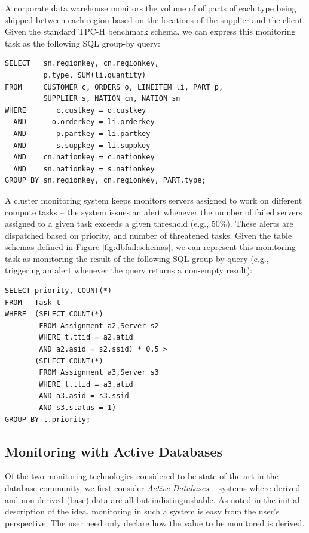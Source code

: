 \begin{example}
\label{ex:dbfail:tpch}
A corporate data warehouse monitors the volume of of parts of each type being shipped between each region based on the locations of the supplier and the client.  Given the standard TPC-H benchmark schema\cite{counciltpc}, we can express this monitoring task as the following SQL group-by query: 
\begin{verbatim}
SELECT   sn.regionkey, cn.regionkey,
         p.type, SUM(li.quantity)
FROM     CUSTOMER c, ORDERS o, LINEITEM li, PART p, 
         SUPPLIER s, NATION cn, NATION sn
WHERE       c.custkey = o.custkey
  AND      o.orderkey = li.orderkey
  AND       p.partkey = li.partkey
  AND       s.suppkey = li.suppkey
  AND    cn.nationkey = c.nationkey
  AND    sn.nationkey = s.nationkey
GROUP BY sn.regionkey, cn.regionkey, PART.type;
\end{verbatim}

\end{example}

\begin{example}
\label{ex:dbfail:network}
A cluster monitoring system keeps monitors servers assigned to work on different compute tasks -- the system issues an alert whenever the number of failed servers assigned to a given task exceeds a given threshold (e.g., 50\%).  These alerts are dispatched based on priority, and number of threatened tasks.  Given the table schemas defined in Figure \ref{fig:dbfail:schemas}, we can represent this monitoring task as monitoring the result of the following SQL group-by query (e.g., triggering an alert whenever the query returns a non-empty result):
\begin{verbatim}
SELECT priority, COUNT(*)
FROM   Task t
WHERE  (SELECT COUNT(*) 
        FROM Assignment a2,Server s2
        WHERE t.ttid = a2.atid 
        AND a2.asid = s2.ssid) * 0.5 > 
       (SELECT COUNT(*) 
        FROM Assignment a3,Server s3
        WHERE t.ttid = a3.atid 
        AND a3.asid = s3.ssid 
        AND s3.status = 1)
GROUP BY t.priority;
\end{verbatim}

\end{example}

\subsection{Monitoring with Active Databases}
\label{sec:dbfail:active}
Of the two monitoring technologies considered to be state-of-the-art in the database community, we first consider {\em Active Databases}\cite{morgenstern1983active} -- systems where derived and non-derived (base) data are all-but indistinguishable.  As noted in the initial description of the idea, monitoring in such a system is easy from the user's perspective; The user need only declare how the value to be monitored is derived.  

